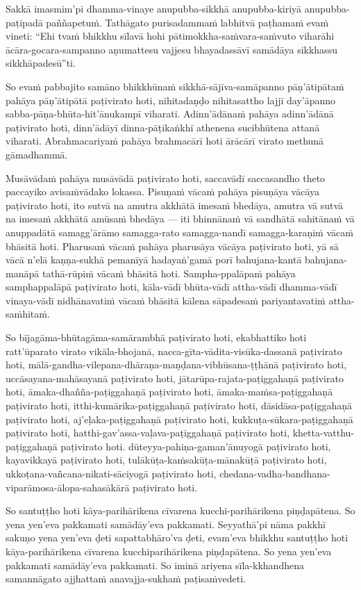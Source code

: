 Sakkā imasmim'pi dhamma-vinaye anupubba-sikkhā anupubba-kiriyā anupubba-paṭipadā paññapetuṁ. Tathāgato purisadammaṁ labhitvā paṭhamaṁ evaṁ vineti: ``Ehi tvaṁ bhikkhu sīlavā hohi pātimokkha-saṁvara-saṁvuto viharāhi ācāra-gocara-sampanno aṇumattesu vajjesu bhayadassāvī samādāya sikkhassu sikkhāpadesū''ti.

\suttaRef{[MN 107]}

So evaṁ pabbajito samāno bhikkhūnaṁ sikkhā-sājīva-samāpanno pāṇ'ātipātaṁ pahāya pāṇ'ātipātā paṭivirato hoti, nihitadaṇḍo nihitasattho lajjī day'āpanno sabba-pāṇa-bhūta-hit'ānukampī viharati. Adinn'ādānaṁ pahāya adinn'ādānā paṭivirato hoti, dinn'ādāyī dinna-pāṭikaṅkhī athenena sucibhūtena attanā viharati. Abrahmacariyaṁ pahāya brahmacārī hoti ārācārī virato methunā gāmadhammā.

Musāvādaṁ pahāya musāvādā paṭivirato hoti, saccavādī saccasandho theto paccayiko avisaṁvādako lokassa. Pisuṇaṁ vācaṁ pahāya pisuṇāya vācāya paṭivirato hoti, ito sutvā na amutra akkhātā imesaṁ bhedāya, amutra vā sutvā na imesaṁ akkhātā amūsaṁ bhedāya — iti bhinnānaṁ vā sandhātā sahitānaṁ vā anuppadātā samagg'ārāmo samagga-rato samagga-nandī samagga-karaṇiṁ vācaṁ bhāsitā hoti. Pharusaṁ vācaṁ pahāya pharusāya vācāya paṭivirato hoti, yā sā vācā n'elā kaṇṇa-sukhā pemanīyā hadayaṅ'gamā porī bahujana-kantā bahujana-manāpā tathā-rūpiṁ vācaṁ bhāsitā hoti. Sampha-ppalāpaṁ pahāya samphappalāpā paṭivirato hoti, kāla-vādī bhūta-vādī attha-vādī dhamma-vādī vinaya-vādī nidhānavatiṁ vācaṁ bhāsitā kālena sāpadesaṁ pariyantavatiṁ attha-saṁhitaṁ.

So bījagāma-bhūtagāma-samārambhā paṭivirato hoti, ekabhattiko hoti ratt'ūparato virato vikāla-bhojanā, nacca-gīta-vādita-visūka-dassanā paṭivirato hoti, mālā­-gandha-vilepana­-dhāraṇa­-maṇḍana­-vibhūsana-ṭṭhānā paṭivirato hoti, uccāsayana-mahāsayanā paṭivirato hoti, jātarūpa-rajata-paṭiggahaṇā paṭivirato hoti, āmaka-dhañña-paṭiggahaṇā paṭivirato hoti, āmaka-maṁsa-paṭiggahaṇā paṭivirato hoti, itthi-kumārika-paṭiggahaṇā paṭivirato hoti, dāsidāsa-paṭiggahaṇā paṭivirato hoti, aj'eḷaka-paṭiggahaṇā paṭivirato hoti, kukkuṭa-sūkara-paṭiggahaṇā paṭivirato hoti, hatthi-gav'assa-vaḷava-paṭiggahaṇā paṭivirato hoti, khetta-vatthu-paṭiggahaṇā paṭivirato hoti. dūteyya-pahiṇa-gaman'ānuyogā paṭivirato hoti, kayavikkayā paṭivirato hoti, tulākūṭa-kaṁsakūṭa-mānakūṭā paṭivirato hoti, ukkoṭana-vañcana-nikati-sāciyogā paṭivirato hoti, chedana-­vadha-bandhana­-viparāmosa-ālopa-sahasākārā paṭivirato hoti.

So santuṭṭho hoti kāya-parihārikena cīvarena kucchi-parihārikena piṇḍapātena. So yena yen'eva pakkamati samādāy'eva pakkamati. Seyyathā'pi nāma pakkhī sakuṇo yena yen'eva ḍeti sapattabhāro'va ḍeti, evam'eva bhikkhu santuṭṭho hoti kāya-parihārikena cīvarena kucchiparihārikena piṇḍapātena. So yena yen'eva pakkamati samādāy'eva pakkamati. So iminā ariyena sīla-kkhandhena samannāgato ajjhattaṁ anavajja-sukhaṁ paṭisaṁvedeti.

